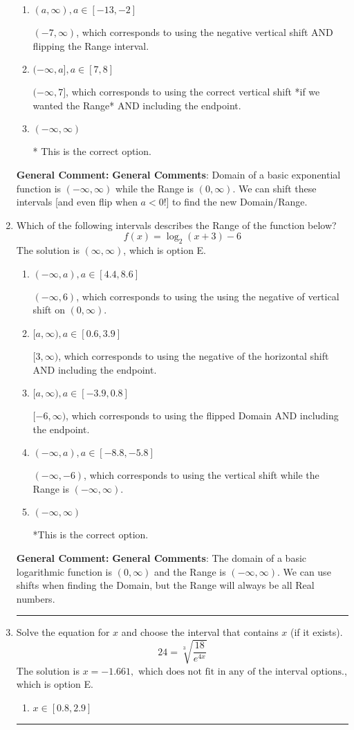 \documentclass{extbook}[14pt]
\newcommand{\litem}[1]{\item #1

\rule{\textwidth}{0.4pt}}
\begin{document}
\begin{enumerate}
{\begin{enumerate}[label=\Alph*.]
$(-\infty, 7)$, which corresponds to using the correct vertical shift *if we wanted the Range*.
\item \( (a, \infty), a \in [-13, -2] \)

$(-7, \infty)$, which corresponds to using the negative vertical shift AND flipping the Range interval.
\item \( (-\infty, a], a \in [7, 8] \)

$(-\infty, 7]$, which corresponds to using the correct vertical shift *if we wanted the Range* AND including the endpoint.
\item \( (-\infty, \infty) \)

* This is the correct option.
\end{enumerate}

\textbf{General Comment:} \textbf{General Comments}: Domain of a basic exponential function is $(-\infty, \infty)$ while the Range is $(0, \infty)$. We can shift these intervals [and even flip when $a<0$!] to find the new Domain/Range.
}
\litem{
Which of the following intervals describes the Range of the function below?
\[ f(x) = \log_2{(x+3)}-6 \]The solution is \( (\infty, \infty) \), which is option E.\begin{enumerate}[label=\Alph*.]
\item \( (-\infty, a), a \in [4.4, 8.6] \)

$(-\infty, 6)$, which corresponds to using the using the negative of vertical shift on $(0, \infty)$.
\item \( [a, \infty), a \in [0.6, 3.9] \)

$[3, \infty)$, which corresponds to using the negative of the horizontal shift AND including the endpoint.
\item \( [a, \infty), a \in [-3.9, 0.8] \)

$[-6, \infty)$, which corresponds to using the flipped Domain AND including the endpoint.
\item \( (-\infty, a), a \in [-8.8, -5.8] \)

$(-\infty, -6)$, which corresponds to using the vertical shift while the Range is $(-\infty, \infty)$.
\item \( (-\infty, \infty) \)

*This is the correct option.
\end{enumerate}

\textbf{General Comment:} \textbf{General Comments}: The domain of a basic logarithmic function is $(0, \infty)$ and the Range is $(-\infty, \infty)$. We can use shifts when finding the Domain, but the Range will always be all Real numbers.
}
\litem{
 Solve the equation for $x$ and choose the interval that contains $x$ (if it exists).
\[  24 = \sqrt[3]{\frac{18}{e^{4x}}} \]The solution is \( x = -1.661, \text{ which does not fit in any of the interval options.} \), which is option E.\begin{enumerate}[label=\Alph*.]
\item \( x \in [0.8, 2.9] \)


\end{enumerate}}
\end{enumerate}
\end{document}

